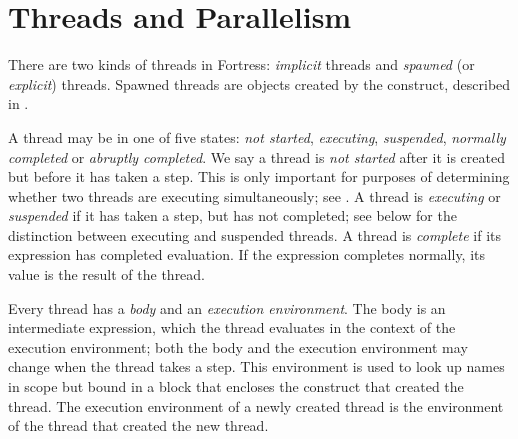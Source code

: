 %
%
%
%

\section{Threads and Parallelism}




There are two kinds of threads in Fortress:
\emph{implicit} threads and \emph{spawned}  (or \emph{explicit}) threads.
Spawned threads are objects created by the  construct,
described in .

A thread may be in one of five states: \emph{not started},
\emph{executing}, \emph{suspended}, \emph{normally completed} or
\emph{abruptly completed}.  We say a thread is \emph{not started}
after it is created but before it has taken a step.  This is only
important for purposes of determining whether two threads are
executing simultaneously; see .  A thread is
\emph{executing} or \emph{suspended} if it has taken a step, but has
not completed; see below for the distinction between executing and
suspended threads.  A thread is \emph{complete} if its expression has
completed evaluation.  If the expression completes normally, its value
is the result of the thread.

Every thread has a \emph{body} and an \emph{execution environment}.
The body is an intermediate expression, which the thread evaluates in
the context of the execution environment; both the body and the
execution environment may change when the thread takes a step.  This
environment is used to look up names in scope but bound in a block
that encloses the construct that created the thread.  The execution
environment of a newly created thread is the environment of the thread
that created the new thread.

